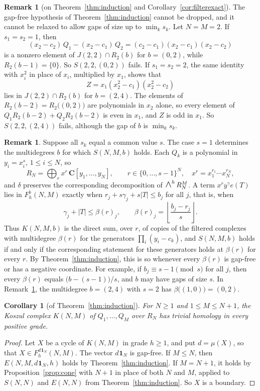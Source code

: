 \documentclass[12pt]{amsart}
\newtheorem{corollary}[theorem]{Corollary}
\theoremstyle{definition}
\newtheorem{remark1}[theorem]{Remark}
\theoremstyle{remark}
\newcommand{\BC}{\mathbf C}
\newcommand{\One}{\mathbf{1}}
\newcommand{\dOne}[1]{d\mspace{1mu}\One_{#1}}
\newcommand{\WedgeAux}[2]{\scalebox{1.35}{$#1\wedge$}}
\newcommand{\Wedge}{\mathop{\mathpalette\WedgeAux\relax}\nolimits}
\begin{document}
\begin{remark1}[on Theorem~\ref{thm:induction} and Corollary~\ref{cor:filterexact}]\label{rem:gapneeded}
The gap-free hypothesis of Theorem~\ref{thm:induction} cannot be dropped,
and it cannot be relaxed to allow gaps of size up to $\min_k s_k$.
Let $N = M = 2$.  If $s_1 = s_2 = 1$, then
\[
(x_2 - c_2)\,Q_1 - (x_2 - c_1)\,Q_2 = (c_2 - c_1)(x_2 - c_1)(x_2 - c_2)
\]
is a nonzero element of $J(2, 2) \cap R_2(b)$ for $b = (0, 2)$, while
$R_2(b - 1) = \{0\}$.  So $S(2, 2, (0, 2))$ fails.
If $s_1 = s_2 = 2$, the same identity with $x_i^2$ in place of $x_i$,
multiplied by $x_1$, shows that
\[
Z = x_1 (x_2^2 - c_1)(x_2^2 - c_2)
\]
lies in $J(2, 2) \cap R_2(b)$ for $b = (2, 4)$.  The elements of
$R_2(b - 2) = R_2\bigl((0, 2)\bigr)$ are polynomials in $x_2$ alone, so every
element of $Q_1 R_2(b-2) + Q_2 R_2(b-2)$ is even in $x_1$, and $Z$ is odd
in $x_1$.  So $S(2, 2, (2, 4))$ fails, although the gap of $b$ is
$\min_k s_k$.
\end{remark1}

\begin{remark1}\label{rem:uniform}
Suppose all $s_k$ equal a common value $s$.  The case $s = 1$
determines the multidegrees $b$ for which $S(N, M, b)$ holds.
Each $Q_k$ is a polynomial in $y_i = x_i^s$, $1 \leq i \leq N$, so
\[
R_N = \bigoplus_{r} x^r\, \BC[y_1, \ldots, y_N], \qquad
r \in \{0, \ldots, s-1\}^N, \quad x^r = x_1^{r_1}\cdots x_N^{r_N},
\]
and $\delta$ preserves the corresponding decomposition of $\Wedge^h R_N^M$.
A term $x^r y^\gamma e(T)$ lies in $F^b_h(N, M)$ exactly when
$r_j + s\gamma_j + s|T| \leq b_j$ for all $j$, that is, when
\[
\gamma_j + |T| \leq \beta(r)_j, \qquad
\beta(r)_j = \left\lfloor \frac{b_j - r_j}{s} \right\rfloor .
\]
Thus $K(N, M, b)$ is the direct sum, over $r$, of copies of the filtered
complexes with multidegree $\beta(r)$ for the generators
$\prod_i (y_i - c_k)$, and
$S(N, M, b)$ holds if and only if the corresponding statement for
these generators holds at $\beta(r)$ for every $r$.
By Theorem~\ref{thm:induction}, this is so whenever every $\beta(r)$ is
gap-free or has a negative coordinate.  For example, if
$b_j \equiv s - 1 \pmod{s}$ for all $j$, then every $\beta(r)$ equals
$\bigl(b - (s-1)\bigr)/s$, and $b$ may have gaps of size $s$.
In Remark~\ref{rem:gapneeded}, the multidegree $b = (2, 4)$ with $s = 2$
has $\beta\bigl((1, 0)\bigr) = (0, 2)$.
\end{remark1}

\begin{corollary}[of Theorem~\ref{thm:induction}]\label{cor:koszulexact}
For $N\ge1$ and $1\le M\le N+1$, the Koszul complex $K(N,M)$ of
$Q_1,\dots,Q_M$ over $R_N$ has trivial homology in every positive grade.
\end{corollary}
\begin{proof}
Let $X$ be a cycle of $K(N,M)$ in grade $h\ge1$, and put $d=\mu(X)$, so
that $X\in F^{\dOne{N}}_h(N,M)$.  The vector $\dOne{N}$ is gap-free.  If
$M\le N$, then $E(N,M,\dOne{N},h)$ holds by Theorem~\ref{thm:induction}.
If $M=N+1$, it holds by Proposition~\ref{prop:cone} with $N+1$ in place of
both $N$ and $M$, applied to $S(N,N)$ and $E(N,N)$ from
Theorem~\ref{thm:induction}.  So $X$ is a boundary.
\end{proof}
\end{document}
